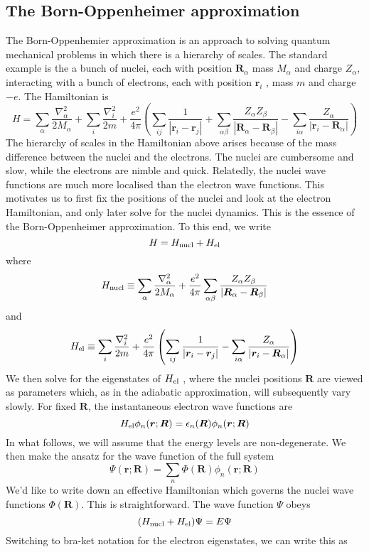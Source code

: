 \subsection{The Born-Oppenheimer approximation}
The Born-Oppenhemier approximation is an approach to solving quantum mechanical problems in which there is a hierarchy of scales. 
The standard example is the a bunch of nuclei, each with position $\bm{R}_{\alpha}$ mass $M_{\alpha}$ and charge $Z_{\alpha}$, interacting with a bunch of electrons, each with position $\bm{r}_i$ , mass $m$ and charge $-e$. 
The Hamiltonian is
\[H = \sum_{\alpha} \frac{\nabla^2_{\alpha}}{2M_{\alpha}} + \sum_{i} \frac{\nabla^2_{i}}{2m} + \frac{e^2}{4\pi} \left(\sum_{ij} \frac{1}{|\bm{r}_i - \bm{r}_j|} + \sum_{\alpha \beta} \frac{Z_{\alpha} Z_{\beta}}{|\bm{R}_{\alpha} - \bm{R}_{\beta}|} - \sum_{i\alpha} \frac{Z_{\alpha}}{|\bm{r}_i - \bm{R}_{\alpha}|} \right)\]
The hierarchy of scales in the Hamiltonian above arises because of the mass difference between the nuclei and the electrons. The nuclei are cumbersome and slow, while the
electrons are nimble and quick. 
Relatedly, the nuclei wave functions are much more
localised than the electron wave functions. This motivates us to first fix the positions of the nuclei and look at the electron Hamiltonian, and only later solve for the nuclei dynamics. This is the essence of the Born-Oppenheimer approximation.
To this end, we write
\[H = H_{\rm nucl} + H_{\rm el}\]
where
\[H_{\rm nucl} \equiv \sum_{\alpha} \frac{\nabla^2_{\alpha}}{2M_{\alpha}} + \frac{e^2}{4\pi}  \sum_{\alpha \beta} \frac{Z_{\alpha} Z_{\beta}}{|\bm{R}_{\alpha} - \bm{R}_{\beta}|}\]
and
\[H_{\rm el} \equiv  \sum_{i} \frac{\nabla^2_{i}}{2m} + \frac{e^2}{4\pi} \left(\sum_{ij} \frac{1}{|\bm{r}_i - \bm{r}_j|}  - \sum_{i\alpha} \frac{Z_{\alpha}}{|\bm{r}_i - \bm{R}_{\alpha}|} \right)\]
We then solve for the eigenstates of $H_{\rm el}$ , where the nuclei positions $\bm{R}$ are viewed as parameters which, as in the adiabatic approximation, will subsequently vary slowly.
For fixed $\bm{R}$, the instantaneous electron wave functions are
\[H_{\rm el} \phi_n(\bm{r};\bm{R}) = \epsilon_n(\bm{R}) \phi_n(\bm{r};\bm{R})\]
In what follows, we will assume that the energy levels are non-degenerate. We then make the ansatz for the wave function of the full system
\[\Psi(\bm{r};\bm{R}) = \sum_n \Phi(\bm{R})\phi_n(\bm{r};\bm{R})\]
We'd like to write down an effective Hamiltonian which governs the nuclei wave functions $\Phi(\bm{R})$. 
This is straightforward. The wave function $\Psi$ obeys
\[(H_{\rm nucl} + H_{\rm el}) \Psi = E\Psi\]
Switching to bra-ket notation for the electron eigenstates, we can write this as
